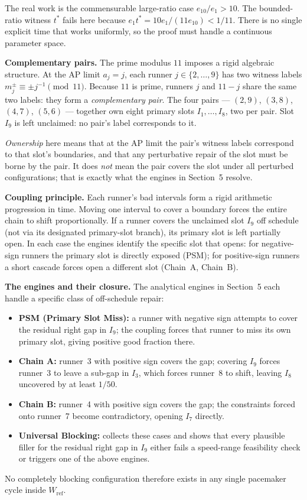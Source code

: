 \documentclass[12pt,a4paper]{amsart}
\theoremstyle{definition}
\theoremstyle{remark}
\newcommand{\Wref}{W_{\mathrm{ref}}}
\begin{document}
The real work is the commensurable large-ratio case $e_{10}/e_1>10$. The bounded-ratio
witness $t^*$ fails here because $e_1 t^*=10e_1/(11e_{10})<1/11$. There is no single
explicit time that works uniformly, so the proof must handle a continuous parameter space.

\medskip\noindent\textbf{Complementary pairs.}
The prime modulus $11$ imposes a rigid algebraic structure. At the AP limit $a_j=j$, each
runner $j\in\{2,\ldots,9\}$ has two witness labels $m_j^{\pm}\equiv\pm j^{-1}\pmod{11}$.
Because $11$ is prime, runners $j$ and $11-j$ share the same two labels: they form a
\emph{complementary pair}. The four pairs --- $(2,9)$, $(3,8)$, $(4,7)$, $(5,6)$ ---
together own eight primary slots $I_1,\ldots,I_8$, two per pair. Slot $I_9$ is left
unclaimed: no pair's label corresponds to it.

\emph{Ownership} here means that at the AP limit the pair's witness labels correspond to
that slot's boundaries, and that any perturbative repair of the slot must be borne by the
pair. It does \emph{not} mean the pair covers the slot under all perturbed configurations;
that is exactly what the engines in Section~5 resolve.

\medskip\noindent\textbf{Coupling principle.}
Each runner's bad intervals form a rigid arithmetic progression in time. Moving one
interval to cover a boundary forces the entire chain to shift proportionally. If a runner
covers the unclaimed slot $I_9$ off schedule (not via its designated primary-slot branch),
its primary slot is left partially open. In each case the engines identify the specific
slot that opens: for negative-sign runners the primary slot is directly exposed (PSM);
for positive-sign runners a short cascade forces open a different slot (Chain~A, Chain~B).

\medskip\noindent\textbf{The engines and their closure.}
The analytical engines in Section~5 each handle a specific class of off-schedule repair:
\begin{itemize}
  \item \textbf{PSM (Primary Slot Miss):} a runner with negative sign attempts to cover
        the residual right gap in $I_9$; the coupling forces that runner to miss its own
        primary slot, giving positive good fraction there.
  \item \textbf{Chain A:} runner~3 with positive sign covers the gap; covering $I_9$
        forces runner~3 to leave a sub-gap in $I_3$, which forces runner~8 to shift,
        leaving $I_8$ uncovered by at least $1/50$.
  \item \textbf{Chain B:} runner~4 with positive sign covers the gap; the constraints
        forced onto runner~7 become contradictory, opening $I_7$ directly.
  \item \textbf{Universal Blocking:} collects these cases and shows that every plausible
        filler for the residual right gap in $I_9$ either fails a speed-range feasibility
        check or triggers one of the above engines.
\end{itemize}
No completely blocking configuration therefore exists in any single pacemaker cycle
inside $\Wref$.
\end{document}
